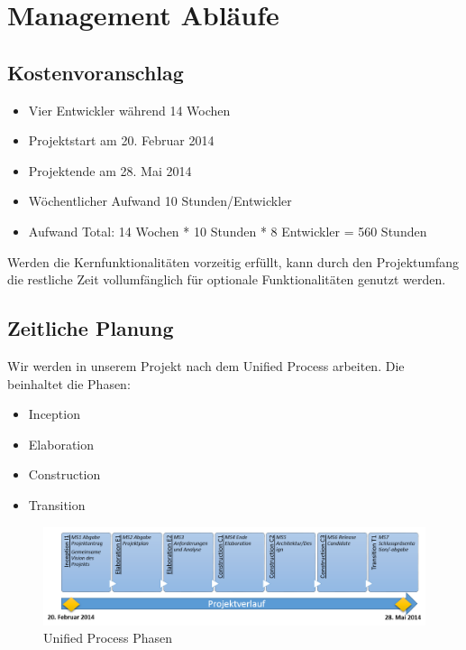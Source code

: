 \chapter{Management Abläufe}

\section{Kostenvoranschlag}
\begin{itemize}
    \item Vier Entwickler während 14 Wochen
    \item Projektstart am 20. Februar 2014
    \item Projektende am 28. Mai 2014
    \item Wöchentlicher Aufwand 10 Stunden/Entwickler
    \item Aufwand Total: 14 Wochen * 10 Stunden * 8 Entwickler = 560 Stunden
\end{itemize}
Werden die Kernfunktionalitäten vorzeitig erfüllt, kann durch den Projektumfang die restliche Zeit vollumfänglich für optionale Funktionalitäten genutzt werden.

\section{Zeitliche Planung}
Wir werden in unserem Projekt nach dem Unified Process arbeiten. Die beinhaltet die Phasen: 
\\\begin{itemize}
    \item Inception
    \item Elaboration
    \item Construction
    \item Transition
\end{itemize}
\begin{figure}[ht]
    \center
    \includegraphics[width=\textwidth]{content/images/projektverlauf.png}
    \caption{Unified Process Phasen}
\end{figure}

